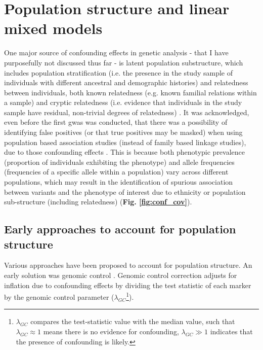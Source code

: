 \section{Population structure and linear mixed models}
\label{sec:linear_mixed_models}

One major source of confounding effects in genetic analysis - that I have purposefully not discussed thus far -  is latent population substructure, which includes population stratification (i.e. the presence in the study sample of individuals with different ancestral and demographic histories) and relatedness between individuals, both known relatedness (e.g. known familial relations within a sample) and cryptic relatedness (i.e. evidence that individuals in the study sample have residual, non-trivial degrees of relatedness) \cite{mccarthy2008genome}.
It was acknowledged, even before the first \gls{gwas} was conducted, that there was a possibility of identifying false positives (or that true positives may be masked) when using population based association studies (instead of family based linkage studies), due to those confounding effects \cite{burton2005key}. 
This is because both phenotypic prevalence (proportion of individuals exhibiting the phenotype) and allele frequencies (frequencies of a specific allele within a population) vary across different populations, which may result in the identification of spurious association between variants and the phenotype of interest due to ethnicity or population sub-structure (including relatedness) \cite{burton2005key} (\textbf{Fig. \ref{fig:conf_cov}}).


\subsection{Early approaches to account for population structure}
\label{sec:pop_struct_noLMM}

Various approaches have been proposed to account for population structure.
An early solution was genomic control \cite{devlin1999genomic}.
Genomic control correction adjusts for inflation due to confounding effects by dividing the test statistic of each marker by the genomic control parameter ($\lambda_{GC}$\footnote{$\lambda_{GC}$ compares the test-statistic value with the median value, such that $\lambda_{GC} \approx 1$ means there is no evidence for confounding, $\lambda_{GC} \gg 1$ indicates that the presence of confounding is likely.}). \\

\newpage

